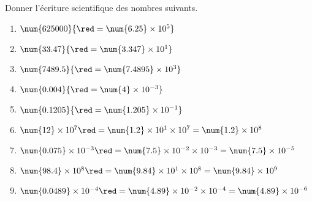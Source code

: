     Donner l'écriture scientifique des nombres suivants.
    \begin{enumerate}
        \item $\num{625000}                 {\red =\num{6.25}\times 10^{5}}$
        \item $\num{33.47}                  {\red =\num{3.347}\times 10^{1}}$
        \item $\num{7489.5}                 {\red =\num{7.4895}\times 10^{3}}$
        \item $\num{0.004}                  {\red =\num{4}\times 10^{-3}}$
        \item $\num{0.1205}                 {\red =\num{1.205}\times 10^{-1}}$
        \item $\num{12}\times 10^7          {\red =\num{1.2}\times 10^{1}\times 10^7=\num{1.2}\times 10^8}$
        \item $\num{0.075}\times 10^{-3}    {\red =\num{7.5}\times 10^{-2}\times 10^{-3}=\num{7.5}\times 10^{-5}}$
        \item $\num{98.4}\times 10^8        {\red =\num{9.84}\times 10^{1}\times 10^8=\num{9.84}\times 10^{9}}$
        \item $\num{0.0489}\times 10^{-4}   {\red =\num{4.89}\times 10^{-2}\times 10^{-4}=\num{4.89}\times 10^{-6}}$
    \end{enumerate}
